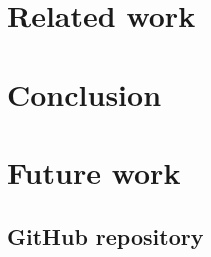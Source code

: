 \documentclass[print]{uit-thesis}
\begin{document}
\chapter{Related work}


\chapter{Conclusion}


\chapter{Future work}


\printbibliography

\begin{appendices}
\chapter{GitHub repository}

\end{appendices}

\backmatter
\end{document}
